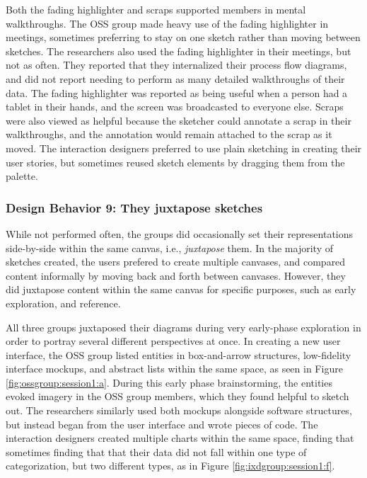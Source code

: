 Both the fading highlighter and scraps supported members in mental walkthroughs. The OSS group made heavy use of the fading highlighter in meetings, sometimes preferring to stay on one sketch rather than moving between sketches. The researchers also used the fading highlighter in their meetings, but not as often. They reported that they internalized their process flow diagrams, and did not report needing to perform as many detailed walkthroughs of their data. The fading highlighter was reported as being useful when a person had a tablet in their hands, and the screen was broadcasted to everyone else. Scraps were also viewed as helpful because the sketcher could annotate a scrap in their walkthroughs, and the annotation would remain attached to the scrap as it moved. The interaction designers preferred to use plain sketching in creating their user stories, but sometimes reused sketch elements by dragging them from the palette.

\subsubsection{Design Behavior 9: They juxtapose sketches}

While not performed often, the groups did occasionally set their representations side-by-side within the same canvas, i.e., \textit{juxtapose} them. In the majority of sketches created, the users prefered to create multiple canvases, and compared content informally by moving back and forth between canvases. However, they did juxtapose content within the same canvas for specific purposes, such as early exploration, and reference.

All three groups juxtaposed their diagrams during very early-phase exploration in order to portray several different perspectives at once. In creating a new user interface, the OSS group listed entities in box-and-arrow structures, low-fidelity interface mockups, and abstract lists within the same space, as seen in Figure \ref{fig:ossgroup:session1:a}. During this early phase brainstorming, the entities evoked imagery in the OSS group members, which they found helpful to sketch out. The researchers similarly used both mockups alongside software structures, but instead began from the user interface and wrote pieces of code. The interaction designers created multiple charts within the same space, finding that sometimes finding that that their data did not fall within one type of categorization, but two different types, as in Figure \ref{fig:ixdgroup:session1:f}. 

